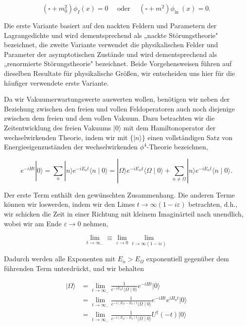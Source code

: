 \documentclass[10pt, letterpaper]{article}
\begin{document}
$$
\left(\square+m_{0}^{2}\right) \phi_{I}(x)=0 \quad \text { oder } \quad\left(\square+m^{2}\right) \phi_{\text {in }}(x)=0 .
$$

Die erste Variante basiert auf den nackten Feldern und Parametern der Lagrangedichte und wird dementsprechend als „nackte Störungstheorie" bezeichnet, die zweite Variante verwendet die physikalischen Felder und Parameter der asymptotischen Zustände und wird dementsprechend als „renormierte Störungstheorie" bezeichnet. Beide Vorgehensweisen führen auf dieselben Resultate für physikalische Größen, wir entscheiden uns hier für die häufiger verwendete erste Variante.

Da wir Vakuumerwartungswerte auswerten wollen, benötigen wir neben der Beziehung zwischen den freien und vollen Feldoperatoren auch noch diejenige zwischen dem freien und dem vollen Vakuum. Dazu betrachten wir die Zeitentwicklung des freien Vakuums $|0\rangle$ mit dem Hamiltonoperator der wechselwirkenden Theorie, indem wir mit $\{|n\rangle\}$ einen vollständigen Satz von Energieeigenzuständen der wechselwirkenden $\phi^{4}$-Theorie bezeichnen,

$$
e^{-i H t}|0\rangle=\sum_{n}|n\rangle e^{-i E_{n} t}\langle n \mid 0\rangle=|\Omega\rangle e^{-i E_{\Omega} t}\langle\Omega \mid 0\rangle+\sum_{n \neq \Omega}|n\rangle e^{-i E_{n} t}\langle n \mid 0\rangle .
$$

Der erste Term enthält den gewünschten Zusammenhang. Die anderen Terme können wir loswerden, indem wir den Limes $t \rightarrow \infty(1-i \varepsilon)$ betrachten, d.h., wir schicken die Zeit in einer Richtung mit kleinem Imaginärteil nach unendlich, wobei wir am Ende $\varepsilon \rightarrow 0$ nehmen,

$$
\lim _{t \rightarrow \infty_{-}} \equiv \lim _{\varepsilon \rightarrow 0} \lim _{t \rightarrow \infty(1-i \varepsilon)}
$$

Dadurch werden alle Exponenten mit $E_{n}>E_{\Omega}$ exponentiell gegenüber dem führenden Term unterdrückt, und wir behalten

$$
\begin{aligned}
|\Omega\rangle & =\lim _{t \rightarrow \infty_{-}} \frac{1}{e^{-i E_{\Omega} t}\langle\Omega \mid 0\rangle} e^{-i H t}|0\rangle \\
& =\lim _{t \rightarrow \infty_{-}} \frac{1}{e^{-i\left(E_{\Omega}-E_{0}\right) t}\langle\Omega \mid 0\rangle} e^{-i H t} e^{i H_{0} t}|0\rangle \\
& =\lim _{t \rightarrow \infty_{-}} \frac{1}{e^{-i\left(E_{\Omega}-E_{0}\right) t}\langle\Omega \mid 0\rangle} U^{\dagger}(-t)|0\rangle
\end{aligned}
$$
\end{document}
